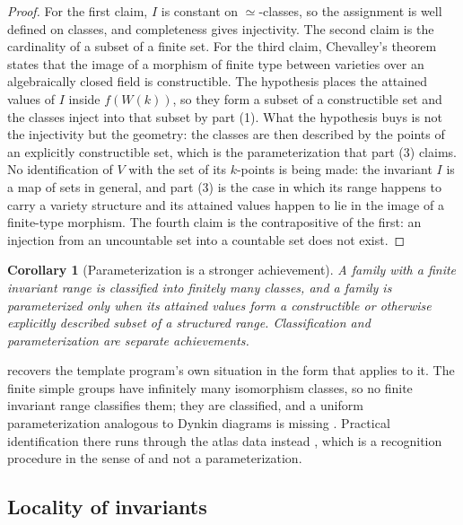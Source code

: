 \documentclass[11pt,letterpaper]{article}
\newtheorem{corollary}[theorem]{Corollary}
\theoremstyle{definition}
\theoremstyle{remark}
\begin{document}
\begin{proof}
For the first claim, $I$ is constant on $\simeq$-classes, so the assignment is well defined on classes, and completeness gives injectivity. The second claim is the cardinality of a subset of a finite set. For the third claim, Chevalley's theorem states that the image of a morphism of finite type between varieties over an algebraically closed field is constructible. The hypothesis places the attained values of $I$ inside $f(W(k))$, so they form a subset of a constructible set and the classes inject into that subset by part (1). What the hypothesis buys is not the injectivity but the geometry: the classes are then described by the points of an explicitly constructible set, which is the parameterization that part (3) claims. No identification of $V$ with the set of its $k$-points is being made: the invariant $I$ is a map of sets in general, and part (3) is the case in which its range happens to carry a variety structure and its attained values happen to lie in the image of a finite-type morphism. The fourth claim is the contrapositive of the first: an injection from an uncountable set into a countable set does not exist.
\end{proof}

\begin{corollary}[Parameterization is a stronger achievement]
\label{cor:parameterization}
A family with a finite invariant range is classified into finitely many classes, and a family is parameterized only when its attained values form a constructible or otherwise explicitly described subset of a structured range. Classification and parameterization are separate achievements.
\end{corollary}

 recovers the template program's own situation in the form that applies to it. The finite simple groups have infinitely many isomorphism classes, so no finite invariant range classifies them; they are classified, and a uniform parameterization analogous to Dynkin diagrams is missing \cite{cfsg,solomon}. Practical identification there runs through the atlas data instead \cite{atlas}, which is a recognition procedure in the sense of  and not a parameterization.

\subsection{Locality of invariants}
\label{sec:locality}
\end{document}
